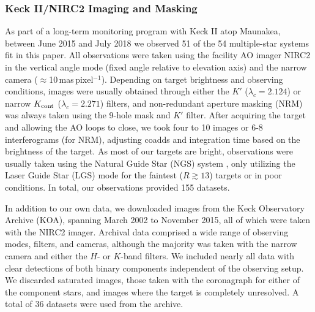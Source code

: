 \documentclass[twocolumn]{aastex62}
\begin{document}
\subsubsection{Keck II/NIRC2 Imaging and Masking}
As part of a long-term monitoring program with Keck II atop Maunakea, between June 2015 and July 2018 we observed 51 of the 54 multiple-star systems fit in this paper. %
All observations were taken using the facility AO imager NIRC2 in the vertical angle mode (fixed angle relative to elevation axis) and the narrow camera ($\approx$10\,mas\,pixel$^{-1}$). Depending on target brightness and observing conditions, images were usually obtained through either the $K'$ ($\lambda_c=2.124$\um) or narrow $K_{\rm{cont}}$ ($\lambda_c=2.271$\um) filters, and non-redundant aperture masking (NRM) was always taken using the 9-hole mask and $K'$ filter. After acquiring the target and allowing the AO loops to close, we took four to 10 images or 6-8 interferograms (for NRM), adjusting coadds and integration time based on the brightness of the target. As most of our targets are bright, observations were usually taken using the Natural Guide Star (NGS) system \citep{2000PASP..112..315W,2004ApOpt..43.5458V}, only utilizing the Laser Guide Star (LGS) mode for the faintest ($R\gtrsim13$) targets or in poor conditions. In total, our observations provided 155 datasets.%

In addition to our own data, we downloaded images from the Keck Observatory Archive (KOA), spanning March 2002 to November 2015, all of which were taken with the NIRC2 imager. Archival data comprised a wide range of observing modes, filters, and cameras, although the majority was taken with the narrow camera and either the $H$- or $K$-band filters. We included nearly all data with clear detections of both binary components independent of the observing setup. We discarded saturated images, those taken with the coronagraph for either of the component stars, and images where the target is completely unresolved. A total of 36 datasets were used from the archive. 
\end{document}
